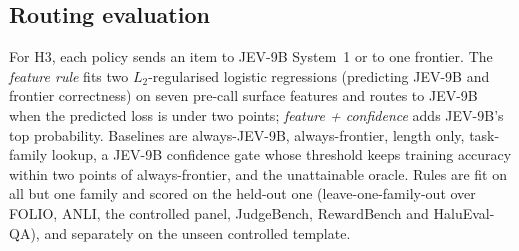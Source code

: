 \subsection{Routing evaluation}
\label{sec:routing}
For H3, each policy sends an item to JEV-9B System~1 or to one frontier.
The \emph{feature rule} fits two $L_2$-regularised logistic regressions (predicting JEV-9B and frontier correctness) on seven pre-call surface features and routes to JEV-9B when the predicted loss is under two points; \emph{feature + confidence} adds JEV-9B's top probability.
Baselines are always-JEV-9B, always-frontier, length only, task-family lookup, a JEV-9B confidence gate whose threshold keeps training accuracy within two points of always-frontier, and the unattainable oracle.
Rules are fit on all but one family and scored on the held-out one (leave-one-family-out over FOLIO, ANLI, the controlled panel, JudgeBench, RewardBench and HaluEval-QA), and separately on the unseen controlled template.
